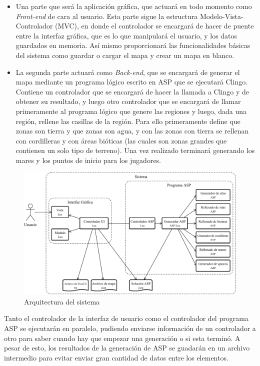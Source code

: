 \begin{itemize}
	\item Una parte que será la aplicación gráfica, que actuará en todo momento como \textit{Front-end} de cara al usuario. Esta parte sigue la estructura Modelo-Vista-Controlador (MVC), en donde el controlador se encargará de hacer de puente entre la interfaz gráfica, que es lo que manipulará el usuario, y los datos guardados en memoria. Así mismo proporcionará las funcionalidades básicas del sistema como guardar o cargar el mapa y crear un mapa en blanco.
	\item La segunda parte actuará como \textit{Back-end}, que se encargará de generar el mapa mediante un programa lógico escrito en ASP que se ejecutará Clingo. Contiene un controlador que se encargará de hacer la llamada a Clingo y de obtener su resultado, y luego otro controlador que se encargará de llamar primeramente al programa lógico que genere las regiones y luego, dada una región, rellene las casillas de la región. Para ello primeramente define que zonas son tierra y que zonas son agua, y con las zonas con tierra se rellenan con cordilleras y con áreas bióticas (las cuales son zonas grandes que contienen un solo tipo de terreno). Una vez realizado terminará generando los mares y los puntos de inicio para los jugadores.
\end{itemize}

\begin{figure}[!h]
	\centering
	\includegraphics[width=\textwidth]{images/arquitectura.pdf}
	\caption{Arquitectura del sistema}
	\label{fig:arquitectura}
\end{figure}

Tanto el controlador de la interfaz de usuario como el controlador del programa ASP se ejecutarán en paralelo, pudiendo enviarse información de un controlador a otro para saber cuando hay que empezar una generación o si esta terminó. A pesar de esto, los resultados de la generación de ASP se guadarán en un archivo intermedio para evitar enviar gran cantidad de datos entre los elementos.

